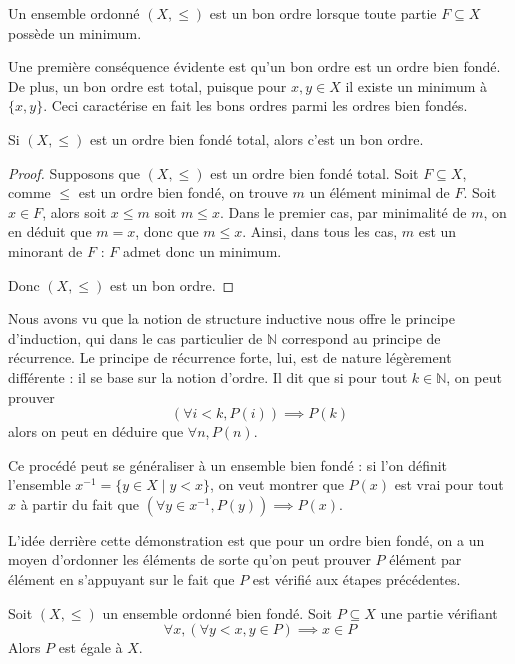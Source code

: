 \begin{definition}
  Un ensemble ordonné $(X,\leq)$ est un bon ordre lorsque toute partie
  $F\subseteq X$ possède un minimum.
\end{definition}

Une première conséquence évidente est qu'un bon ordre est un ordre bien fondé.
De plus, un bon ordre est total, puisque pour $x,y\in X$ il existe un minimum
à $\{x,y\}$. Ceci caractérise en fait les bons ordres parmi les ordres bien
fondés.

\begin{proposition}
  Si $(X,\leq)$ est un ordre bien fondé total, alors c'est un bon ordre.
\end{proposition}

\begin{proof}
  Supposons que $(X,\leq)$ est un ordre bien fondé total. Soit $F\subseteq X$,
  comme $\leq$ est un ordre bien fondé, on trouve $m$ un élément minimal de $F$.
  Soit $x\in F$, alors soit $x \leq m$ soit $m\leq x$. Dans le premier cas,
  par minimalité de $m$, on en déduit que $m = x$, donc que $m\leq x$. Ainsi,
  dans tous les cas, $m$ est un minorant de $F$ : $F$ admet donc un minimum.

  Donc $(X,\leq)$ est un bon ordre.
\end{proof}

Nous avons vu que la notion de structure inductive nous offre le principe
d'induction, qui dans le cas particulier de $\mathbb N$ correspond au principe
de récurrence. Le principe de récurrence forte, lui, est de nature légèrement
différente : il se base sur la notion d'ordre. Il dit que si pour tout
$k\in\mathbb N$, on peut prouver
\[(\forall i < k, P(i)) \implies P(k)\]
alors on peut en déduire que $\forall n, P(n)$.

Ce procédé peut se généraliser à un ensemble bien fondé : si l'on définit
l'ensemble
$x^{-1} = \{y \in X \mid y < x\}$, on veut montrer que $P(x)$ est vrai pour tout
$x$ à partir du fait que $(\forall y \in x^{-1}, P(y)) \implies P(x)$.

L'idée derrière cette démonstration est que pour un ordre bien fondé, on a un
moyen d'ordonner les éléments de sorte qu'on peut prouver $P$ élément par
élément en s'appuyant sur le fait que $P$ est vérifié aux étapes précédentes.

\begin{theorem}
  Soit $(X,\leq)$ un ensemble ordonné bien fondé. Soit $P\subseteq X$ une partie
  vérifiant
  \[\forall x, (\forall y < x, y\in P) \implies x\in P\]
  Alors $P$ est égale à $X$.
\end{theorem}

